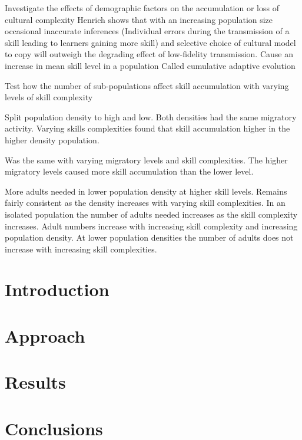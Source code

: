 \documentclass[12pt, letterpaper]{article}
\title{}
\author{William Ewart}
\date{March 2017}
\begin{document}
\begin{titlingpage}
\maketitle
\tableofcontents
\end{titlingpage}
\newpage

Investigate the effects of demographic factors on the accumulation or loss of cultural complexity
Henrich shows that with an increasing population size occasional inaccurate inferences (Individual errors during the transmission of a skill leading to learners gaining more skill) and selective choice of cultural model to copy will outweigh the degrading effect of low-fidelity transmission. Cause an increase in mean skill level in a population
Called cumulative adaptive evolution

Test how the number of sub-populations affect skill accumulation with varying levels of skill complexity

Split population density to high and low. Both densities had the same migratory activity. Varying skills complexities found that skill accumulation higher in the higher density population.

Was the same with varying migratory levels and skill complexities. The higher migratory levels caused more skill accumulation than the lower level.

More adults needed in lower population density at higher skill levels. Remains fairly consistent as the density increases with varying skill complexities.
In an isolated population the number of adults needed increases as the skill complexity increases.
Adult numbers increase with increasing skill complexity and increasing population density. At lower population densities the number of adults does not increase with increasing skill complexities.
\begin{multicols}{2}
\section{Introduction}
\section{Approach}
\section{Results}
\section{Conclusions}

\end{multicols}


\end{document}
